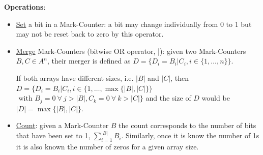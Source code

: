 {\bf Operations}:
\begin{itemize}
	\item \underline{Set} a bit in a Mark-Counter: a bit may change individually from 0 to 1 but may not be reset back to zero by this operator.
	
	\item \underline{Merge} Mark-Counters (bitwise OR operator, |): given two Mark-Counters $B, C \in A^{n}$, their merger is defined as $D = \{D_{i} = B_{i} | C_{i}, i \in \{1,\dots, n\}\}$.
	
	If both arrays have different sizes, i.e. $|B|$ and $|C|$, then $D = \{D_{i} = B_{i} | C_{i}, i \in \{1,\dots, \max{\{|B|, |C|\}}\}$ $\text{ with } B_{j} = 0 ~ \forall ~ j > |B|, C_{k} = 0 ~ \forall ~ k > |C|\}$ and the size of $D$ would be $|D| = \max{\{|B|, |C|\}}$.
	
	\item \underline{Count}: given a Mark-Counter $B$ the count corresponds to the number of bits that have been set to 1, $\sum^{|B|}_{i = 1} B_{i}$. Similarly, once it is know the number of 1s it is also known the number of zeros for a given array size.
\end{itemize}


